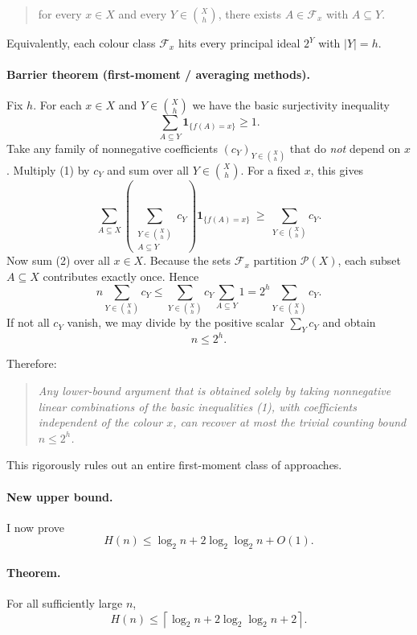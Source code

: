 \begin{quote}
for every $x\in X$ and every $Y\in \binom{X}{h}$, there exists $A\in \mathcal F_x$ with $A\subseteq Y$.
\end{quote}

Equivalently, each colour class $\mathcal F_x$ hits every principal ideal $2^Y$ with $|Y|=h$.

\paragraph{Barrier theorem (first-moment / averaging methods).}
Fix $h$.
For each $x\in X$ and $Y\in \binom{X}{h}$ we have the basic surjectivity inequality
\[
\sum_{A\subseteq Y}\mathbf 1_{\{f(A)=x\}}\ge 1.
\tag{1}
\]
Take any family of nonnegative coefficients $(c_Y)_{Y\in \binom{X}{h}}$ that do \emph{not} depend on $x$.
Multiply (1) by $c_Y$ and sum over all $Y\in \binom{X}{h}$.
For a fixed $x$, this gives
\[
\sum_{A\subseteq X}\left(\sum_{\substack{Y\in \binom{X}{h}\\ A\subseteq Y}} c_Y\right)\mathbf 1_{\{f(A)=x\}}
\ \ge\ 
\sum_{Y\in \binom{X}{h}} c_Y.
\tag{2}
\]
Now sum (2) over all $x\in X$.
Because the sets $\mathcal F_x$ partition $\mathcal P(X)$, each subset $A\subseteq X$ contributes exactly once.
Hence
\[
n\sum_{Y\in \binom{X}{h}} c_Y
\le
\sum_{Y\in \binom{X}{h}} c_Y\sum_{A\subseteq Y}1
=
2^h\sum_{Y\in \binom{X}{h}} c_Y.
\]
If not all $c_Y$ vanish, we may divide by the positive scalar $\sum_Y c_Y$ and obtain
\[
n\le 2^h.
\]

Therefore:

\begin{quote}
\emph{Any lower-bound argument that is obtained solely by taking nonnegative linear combinations
of the basic inequalities (1), with coefficients independent of the colour $x$, can recover at most
the trivial counting bound $n\le 2^h$.}
\end{quote}

This rigorously rules out an entire first-moment class of approaches.

\paragraph{New upper bound.}
I now prove
\[
H(n)\le \log_2 n + 2\log_2\log_2 n + O(1).
\]

\paragraph{Theorem.}
For all sufficiently large $n$,
\[
H(n)\le \left\lceil \log_2 n + 2\log_2\log_2 n + 2\right\rceil.
\]

